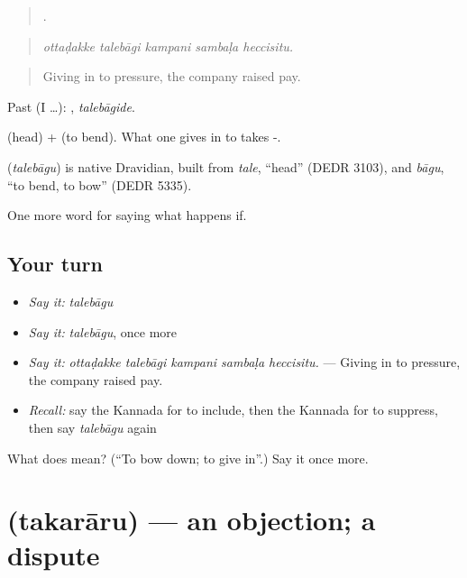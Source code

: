 \begin{quote}
    .
\end{quote}

\begin{quote}
\emph{ottaḍakke talebāgi kampani sambaḷa heccisitu.}
\end{quote}

\begin{quote}
Giving in to pressure, the company raised pay.
\end{quote}

Past (I …): , \emph{talebāgide}.

 (head) +  (to bend). What one gives in to takes -.

\begin{cousinweb}
\textbf{} (\emph{talebāgu}) is native Dravidian, built from \emph{tale}, \textquotedblleft{}head\textquotedblright{} (DEDR 3103), and \emph{bāgu}, \textquotedblleft{}to bend, to bow\textquotedblright{} (DEDR 5335).
\end{cousinweb}

\begin{grammarlens}[title={What you've built}]
One more word for saying what happens if.
\end{grammarlens}

\subsection*{Your turn}
\begin{itemize}
\raggedright
  \item \emph{Say it:} \emph{talebāgu}
  \item \emph{Say it:} \emph{talebāgu}, once more
  \item \emph{Say it:} \emph{ottaḍakke talebāgi kampani sambaḷa heccisitu.} — Giving in to pressure, the company raised pay.
  \item \emph{Recall:} say the Kannada for to include, then the Kannada for to suppress, then say \emph{talebāgu} again
\end{itemize}

\begin{tcolorbox}[breakable,colback=teal!4,colframe=teal!35!black,title={Before you move on}]
What does  mean? (\textquotedblleft{}To bow down; to give in\textquotedblright{}.) Say it once more.
\end{tcolorbox}
\section[\texorpdfstring{\kn{ತಕರಾರು} (takarāru)}{ತಕರಾರು (takarāru)}]{ (takarāru) — an objection; a dispute}


